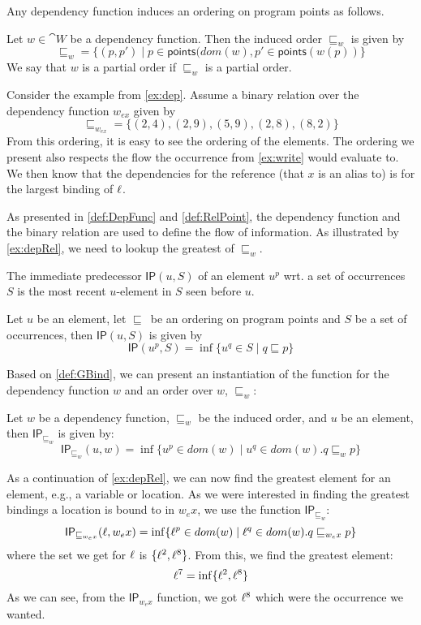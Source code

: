 \documentclass{llncs}
\newcommand{\uf}{\ensuremath{\mathsf{IP}}}
\newcommand{\sqleq}{\ensuremath{\sqsubseteq\xspace}}
\newcommand{\points}{\ensuremath{\textsf{points}}}
\begin{document}
Any dependency function induces an ordering on program points as follows.

\begin{definition}\label{def:RelPoint}
	Let $w\in\cat{W}$ be a dependency function.
	Then the induced order $\sqleq_w$ is given by
	 \[ \sqleq_w= \{(p,p')\mid p \in \points(dom(w), p' \in
           \points(w(p)) \} \]
         	We say that $w$ is a partial order if $\sqleq_w$ is a partial order.
\end{definition}

\begin{example}\label{ex:depRel}
	Consider the example from \cref{ex:dep}. Assume a binary
        relation over the dependency function $w_{ex}$ given by
	\[ \sqleq_{w_{ex}}=\{(2,4),(2,9),(5,9),(2,8),(8,2)\} \]
	From this ordering, it is easy to see the ordering of the elements.
	The ordering we present also respects the flow the occurrence from \cref{ex:write} would evaluate to.
	We then know that the dependencies for the reference (that $x$ is an alias to) is for the largest binding of $\ell$.
\end{example}

As presented in \cref{def:DepFunc} and \cref{def:RelPoint}, the
dependency function and the binary relation are used to define the
flow of information. As illustrated by \cref{ex:depRel}, we need to
lookup the greatest of $\sqleq_w$. 

The immediate predecessor $\uf(u,S)$ of an element $u^p$ wrt. a set of
occurrences $S$ is the most recent $u$-element in $S$ seen before $u$. 

\begin{definition}\label{def:GBind}
  Let $u$ be an element, let \sqleq\ be an ordering on program points
  and $S$ be a set of occurrences, then $\uf(u,S)$ is given by
\[ \uf(u^p,S)=\inf\{u^q\in S\mid q\sqleq p\} \]
\end{definition}

Based on \cref{def:GBind}, we can present an instantiation of the
function for the dependency function $w$ and an order over $w$,
$\sqleq_w$: 

\begin{definition}
  Let $w$ be a dependency function, $\sqleq_w$ be the induced order,
  and $u$ be an element, then $\uf_{\sqleq_w}$ is given by:
	$$\uf_{\sqleq_w}(u,w)=\inf\{u^p\in dom(w)\mid u^q\in dom(w).q\sqleq_w p\}$$
\end{definition}


\begin{example}\label{ex:deplookup}
  As a continuation of \cref{ex:depRel}, we can now find the greatest
  element for an element, e.g., a variable or location.  As we were
  interested in finding the greatest bindings a location is bound to
  in $w_ex$, we use the function $\uf_{\sqleq_w}$:
	\[ \uf_{\sqleq_{w_ex}}(\loc,w_ex)=\inf\{\loc^p\in dom(w)\mid
          \loc^q\in dom(w). q\sqleq_{w_ex} p\} \]
where the set we get for $\ell$ is 
$\{\ell^2,\ell^8\}$. From this, we find the greatest element: 
	\[ \ell^7=\inf\{\ell^2,\ell^8\} \]
	As we can see, from the $\uf_{w_ex}$ function, we got $\ell^8$ which were the occurrence we wanted.
\end{example}
\end{document}
